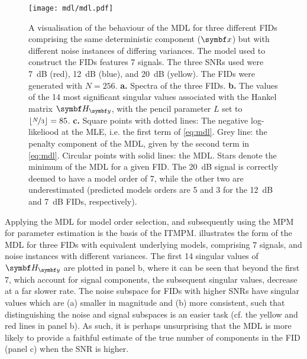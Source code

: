 \begin{figure}%
    \centering
    \texttt{[image: mdl/mdl.pdf]}
    \caption[%
        A visualisation of the behaviour of the \acs{MDL} for three different
        \acsp{FID} comprising the same deterministic component, but with
        different noise variances.
    ]{%
        A visualisation of the behaviour of the \acs{MDL} for three different
        \acsp{FID} comprising the same deterministic component ($\bx$) but
        with different noise instances of differing variances. The model used
        to construct the \acp{FID} features 7
        signals. The three \acsp{SNR} used were
        \qty{7}{\deci\bel} (red), \qty{12}{\deci\bel} (blue), and
        \qty{20}{\deci\bel} (yellow). The \acsp{FID} were generated with $N
        = 256$.
        \textbf{a.} Spectra of the three \acsp{FID}.
        \textbf{b.} The values of the 14 most significant singular values
        associated with the Hankel matrix $\Hy$, with the
        pencil parameter $L$ set to $\lfloor \nicefrac{N}{3} \rfloor =
        85$.
        \textbf{c.} Square points with dotted lines: The negative log-likeliood
        at the \ac{MLE}, i.e. the first term of \cref{eq:mdl}.
        Grey line: the penalty component of the \ac{MDL}, given by the second
        term in \cref{eq:mdl}.
        Circular points with solid lines: the \ac{MDL}.
        Stars denote the minimum of the \ac{MDL} for a given \ac{FID}. The
        \qty{20}{\deci\bel}
        signal is correctly deemed to have a model order of 7, while the other
        two are underestimated (predicted models orders are 5 and 3 for the
        \qty{12}{\deci\bel} and \qty{7}{\deci\bel} \acsp{FID}, respectively).
    }%
    \label{fig:mdl}%
\end{figure}%
Applying the \ac{MDL} for model order selection, and subsequently using the
\ac{MPM} for parameter estimation is the basis of the \ac{ITMPM}\cite{Lin1997}.
 illustrates the form of the \ac{MDL} for three \acp{FID}
with equivalent underlying models, comprising $7$ signals, and noise instances
with different variances. The first 14 singular values of $\Hy$
are plotted in panel b, where it can be seen that beyond the first 7,
which account for signal components, the subsequent singular values, decrease
at a far slower rate. The noise subspace for \acp{FID} with higher \acp{SNR}
have singular values which are (a) smaller in magnitude and (b) more
consistent, such that distinguishing the noise and signal subspaces is an
easier task (cf. the yellow and red lines in panel b). As such, it is perhaps
unsurprising that the \ac{MDL} is more likely to provide a faithful estimate of
the true number of components in the \ac{FID} (panel c) when the \ac{SNR} is
higher.
